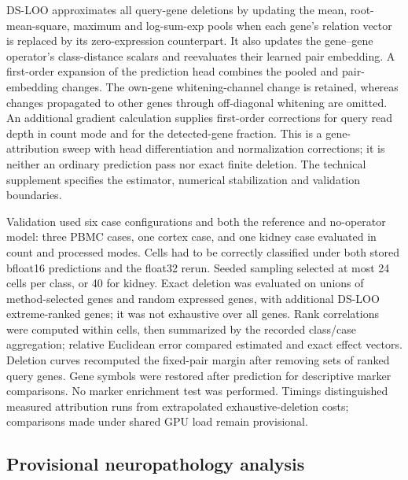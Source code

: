 DS-LOO approximates all query-gene deletions by updating the mean, root-mean-square, maximum and log-sum-exp pools when each gene's relation vector is replaced by its zero-expression counterpart. It also updates the gene--gene operator's class-distance scalars and reevaluates their learned pair embedding. A first-order expansion of the prediction head combines the pooled and pair-embedding changes. The own-gene whitening-channel change is retained, whereas changes propagated to other genes through off-diagonal whitening are omitted. An additional gradient calculation supplies first-order corrections for query read depth in count mode and for the detected-gene fraction. This is a gene-attribution sweep with head differentiation and normalization corrections; it is neither an ordinary prediction pass nor exact finite deletion. The technical supplement specifies the estimator, numerical stabilization and validation boundaries.

Validation used six case configurations and both the reference and no-operator model: three PBMC cases, one cortex case, and one kidney case evaluated in count and processed modes. Cells had to be correctly classified under both stored bfloat16 predictions and the float32 rerun. Seeded sampling selected at most 24 cells per class, or 40 for kidney. Exact deletion was evaluated on unions of method-selected genes and random expressed genes, with additional DS-LOO extreme-ranked genes; it was not exhaustive over all genes. Rank correlations were computed within cells, then summarized by the recorded class/case aggregation; relative Euclidean error compared estimated and exact effect vectors. Deletion curves recomputed the fixed-pair margin after removing sets of ranked query genes. Gene symbols were restored after prediction for descriptive marker comparisons. No marker enrichment test was performed. Timings distinguished measured attribution runs from extrapolated exhaustive-deletion costs; comparisons made under shared GPU load remain provisional.

\subsection*{Provisional neuropathology analysis}

